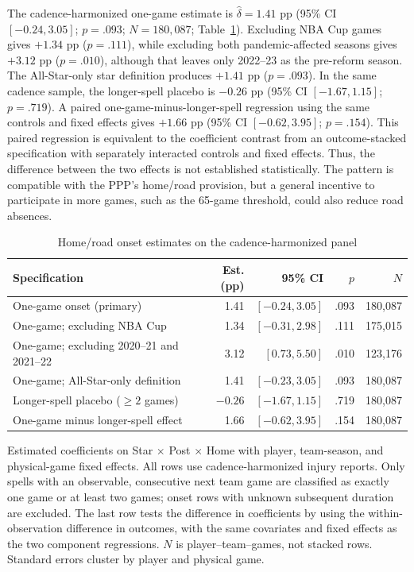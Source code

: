 \documentclass[11pt]{article}
\begin{document}
The cadence-harmonized one-game estimate is $\hat\delta=1.41$ pp (95\% CI $[-0.24,3.05]$; $p = .093$; $N=180{,}087$; Table~\ref{tab:home}). Excluding NBA Cup games gives $+1.34$ pp ($p = .111$), while excluding both pandemic-affected seasons gives $+3.12$ pp ($p = .010$), although that leaves only 2022--23 as the pre-reform season. The All-Star-only star definition produces $+1.41$ pp ($p = .093$). In the same cadence sample, the longer-spell placebo is $-0.26$ pp (95\% CI $[-1.67,1.15]$; $p = .719$). A paired one-game-minus-longer-spell regression using the same controls and fixed effects gives $+1.66$ pp (95\% CI $[-0.62,3.95]$; $p = .154$). This paired regression is equivalent to the coefficient contrast from an outcome-stacked specification with separately interacted controls and fixed effects. Thus, the difference between the two effects is not established statistically. The pattern is compatible with the PPP's home/road provision, but a general incentive to participate in more games, such as the 65-game threshold, could also reduce road absences.

\begin{table}[!htbp]\centering\caption{Home/road onset estimates on the cadence-harmonized panel}\label{tab:home}\footnotesize\setlength{\tabcolsep}{4pt}
\begin{tabular}{@{}lrrrr@{}}\toprule
Specification & Est. (pp) & 95\% CI & $p$ & $N$\\\midrule
One-game onset (primary) & 1.41 & $[-0.24,3.05]$ & .093 & 180,087\\
One-game; excluding NBA Cup & 1.34 & $[-0.31,2.98]$ & .111 & 175,015\\
One-game; excluding 2020--21 and 2021--22 & 3.12 & $[0.73,5.50]$ & .010 & 123,176\\
One-game; All-Star-only definition & 1.41 & $[-0.23,3.05]$ & .093 & 180,087\\
Longer-spell placebo ($\geq 2$ games) & $-0.26$ & $[-1.67,1.15]$ & .719 & 180,087\\
One-game minus longer-spell effect & 1.66 & $[-0.62,3.95]$ & .154 & 180,087\\\bottomrule
\end{tabular}\par\smallskip\raggedright\footnotesize Estimated coefficients on Star $\times$ Post $\times$ Home with player, team-season, and physical-game fixed effects. All rows use cadence-harmonized injury reports. Only spells with an observable, consecutive next team game are classified as exactly one game or at least two games; onset rows with unknown subsequent duration are excluded. The last row tests the difference in coefficients by using the within-observation difference in outcomes, with the same covariates and fixed effects as the two component regressions. $N$ is player--team--games, not stacked rows. Standard errors cluster by player and physical game.
\end{table}
\end{document}
